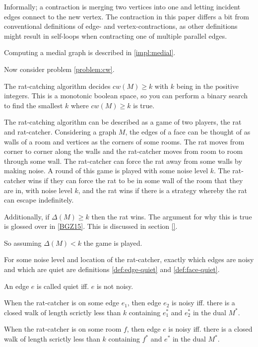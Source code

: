 \documentclass{article}
\begin{document}
	Informally; a contraction is merging two vertices into one and letting incident edges connect to the new vertex. The contraction in this paper differs a bit from conventional definitions of edge- and vertex-contractions, as other definitions might result in self-loops when contracting one of multiple parallel edges.


	Computing a medial graph is described in \ref{impl:medial}.

	Now consider problem \ref{problem:cw}.

	The rat-catching algorithm decides $cw(M) \geq k$ with $k$ being in the positive integers. This is a monotonic boolean space, so you can perform a binary search to find the smallest $k$ where $cw(M) \geq k$ is true.

	The rat-catching algorithm can be described as a game of two players, the rat and rat-catcher. Considering a graph $M$, the edges of a face can be thought of as walls of a room and vertices as the corners of some rooms. The rat moves from corner to corner along the walls and the rat-catcher moves from room to room through some wall. The rat-catcher can force the rat away from some walls by making noise. A round of this game is played with some noise level $k$. The rat-catcher wins if they can force the rat to be in some wall of the room that they are in, with noise level $k$, and the rat wins if there is a strategy whereby the rat can escape indefinitely.

	Additionally, if $\Delta(M) \geq k$ then the rat wins. The argument for why this is true is glossed over in \ref{BGZ15}. This is discussed in section \ref{}.

	So assuming $\Delta(M) < k$ the game is played.

	For some noise level and location of the rat-catcher, exactly which edges are noisy and which are quiet are definitions \ref{def:edge-quiet} and \ref{def:face-quiet}.

	An edge $e$ is called quiet iff. $e$ is not noisy.

	\begin{definition}\label{def:edge-quiet}
		When the rat-catcher is on some edge $e_1$, then edge $e_2$ is noisy iff. there is a closed walk of length scrictly less than $k$ containing $e_1^*$ and $e_2^*$ in the dual $M^*$.
	\end{definition}

	\begin{definition}\label{def:face-quiet}
		When the rat-catcher is on some room $f$, then edge $e$ is noisy iff. there is a closed walk of length scrictly less than $k$ containing $f^*$ and $e^*$ in the dual $M^*$.
	\end{definition}
\end{document}
